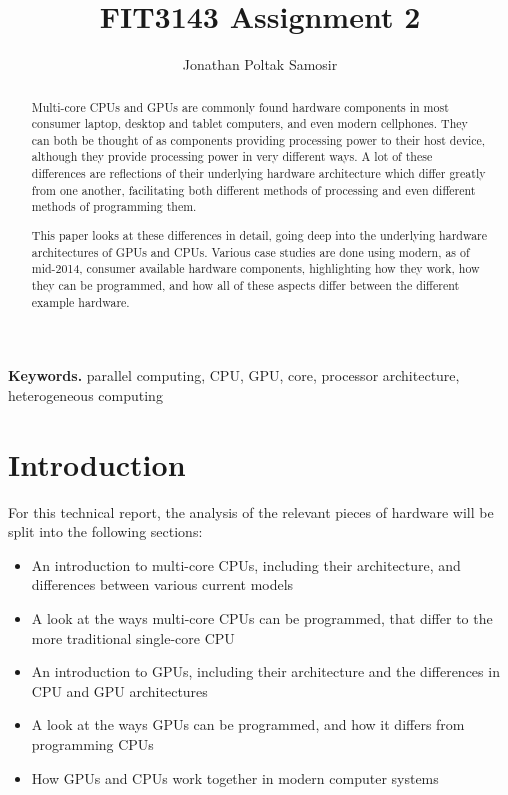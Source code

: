 \documentclass[a4paper,11pt]{article}
\author{Jonathan Poltak Samosir}
\title{FIT3143 Assignment 2}
\begin{document}
\maketitle
\thispagestyle{empty}

\begin{abstract}
Multi-core CPUs and GPUs are commonly found hardware components in most consumer laptop, desktop and tablet computers,
and even modern cellphones. They can both be thought of as components providing processing power to their host device,
although they provide processing power in very different ways. A lot of these differences are reflections of their
underlying hardware architecture which differ greatly from one another, facilitating both different methods of processing
and even different methods of programming them.

This paper looks at these differences in detail, going deep into the underlying hardware architectures of GPUs and CPUs.
Various case studies are done using modern, as of mid-2014, consumer available hardware components, highlighting how
they work, how they can be programmed, and how all of these aspects differ between the different example hardware.
\end{abstract}
\smallskip
\noindent \textbf{Keywords.} parallel computing, CPU, GPU, core, processor architecture, heterogeneous computing
\newpage
{}
\tableofcontents
\newpage


\section{Introduction} %
\label{sec:introduction}
For this technical report, the analysis of the relevant pieces of hardware will be split into the following sections:
\begin{itemize}
  \item An introduction to multi-core CPUs, including their architecture, and differences between various current models
  \item A look at the ways multi-core CPUs can be programmed, that differ to the more traditional single-core CPU
  \item An introduction to GPUs, including their architecture and the differences in CPU and GPU architectures
  \item A look at the ways GPUs can be programmed, and how it differs from programming CPUs
  \item How GPUs and CPUs work together in modern computer systems
\end{itemize}
\end{document}
